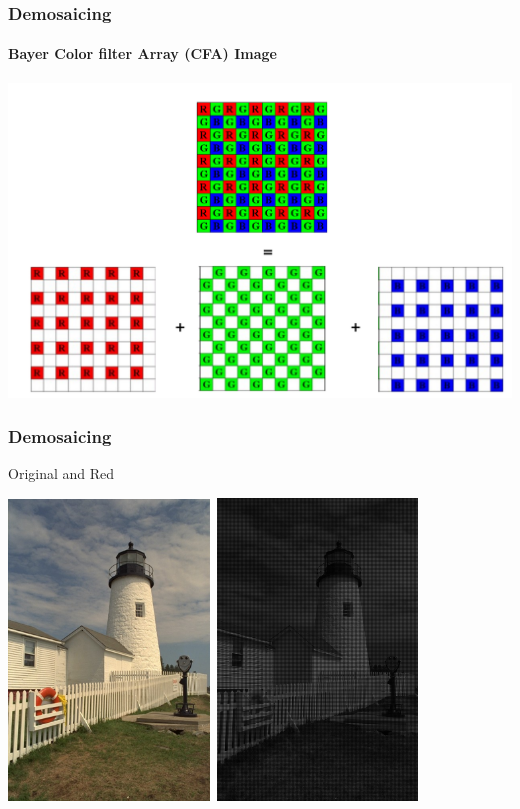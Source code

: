 \documentclass{beamer}
\begin{document}
\begin{frame}
\frametitle{Demosaicing}
\framesubtitle{Bayer Color filter Array (CFA) Image}
\begin{center}
\includegraphics[scale=0.35]{images/L7_BayerSensor.png}
\end{center}
\end{frame}

\begin{frame}
\frametitle{Demosaicing}
\scriptsize{Original and Red}
\begin{center}
\includegraphics[width = 0.4\textwidth, height = 0.6\textheight]{images/L7_lighthouseOri.png}\
\includegraphics[width = 0.4\textwidth, height = 0.6\textheight]{images/L7_lighthouseRedSubSam.png}\
\end{center}
\end{frame}
\end{document}
